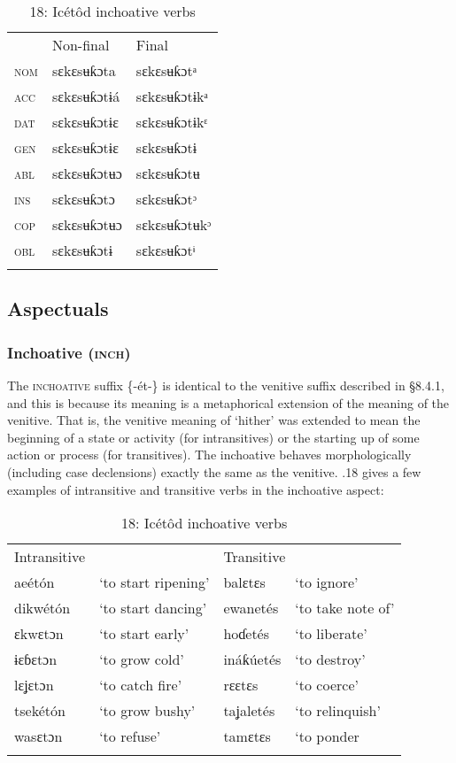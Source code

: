 \begin{table}
\begin{table}
\begin{tabularx}{\textwidth}{XXX} & Non-final & Final\\
\lsptoprule
\textsc{nom} & sɛkɛsʉƙɔta & sɛkɛsʉƙɔtᵃ\\
\textsc{acc} & sɛkɛsʉƙɔtɨá & sɛkɛsʉƙɔtɨkᵃ\\
\textsc{dat} & sɛkɛsʉƙɔtɨɛ & sɛkɛsʉƙɔtɨkᵋ\\
\textsc{gen} & sɛkɛsʉƙɔtɨɛ & sɛkɛsʉƙɔtɨ\\
\textsc{abl} & sɛkɛsʉƙɔtʉɔ & sɛkɛsʉƙɔtʉ\\
\textsc{ins} & sɛkɛsʉƙɔtɔ & sɛkɛsʉƙɔtᵓ\\
\textsc{cop} & sɛkɛsʉƙɔtʉɔ & sɛkɛsʉƙɔtʉkᵓ\\
\textsc{obl} & sɛkɛsʉƙɔtɨ & sɛkɛsʉƙɔtᶤ\\
\lspbottomrule
\end{tabularx}
\end{table}



\subsection{Aspectuals}
\subsubsection{Inchoative (\textsc{inch})}

The \textsc{inchoative} suffix \{-ét-\} is identical to the venitive suffix described in §8.4.1, and this is because its meaning is a metaphorical extension of the meaning of the venitive. That is, the venitive meaning of ‘hither’ was extended to mean the beginning of a state or activity (for intransitives) or the starting up of some action or process (for transitives). The inchoative behaves morphologically (including case declensions) exactly the same as the venitive. .18 gives a few examples of intransitive and transitive verbs in the inchoative aspect:


\begin{table}
\caption{18: Icétôd inchoative verbs}
\label{tab:8}


\begin{tabularx}{\textwidth}{XXXX}
\lsptoprule

Intransitive &  & \multicolumn{2}{X}{Transitive}\\
aeétón & ‘to start ripening’ & balɛtɛs & ‘to ignore’\\
dikwétón & ‘to start dancing’ & ewanetés & ‘to take note of’\\
ɛkwɛtɔn & ‘to start early’ & hoɗetés & ‘to liberate’\\
ɨɛɓɛtɔn & ‘to grow cold’ & ináƙúetés & ‘to destroy’\\
lɛʝɛtɔn & ‘to catch fire’ & rɛɛtɛs & ‘to coerce’\\
tsekétón & ‘to grow bushy’ & taʝaletés & ‘to relinquish’\\
wasɛtɔn & ‘to refuse’ & tamɛtɛs & ‘to ponder\\
\lspbottomrule
\end{tabularx}
\end{table}


\end{table}

